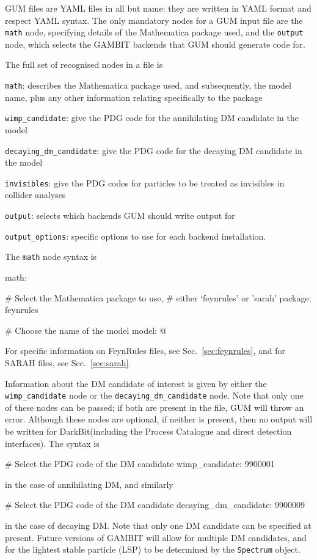 \documentclass[pdftex,twocolumn,epjc3_preprint,runningheads]{svjour3}
\renewcommand{\_}{\discretionary{\underscore}{}{\underscore}}
\newcommand\cpp[1]{{\lstinline!#1!}}  %
\newcommand\term[1]{{\lstset{style=terminal}\lstinline!#1!\lstset{style=cpp}}}
\newcommand\guminline[1]{{{\lstset{style=gum}\lstinline!#1!}}}
\newcommand{\gambit}{\textsf{GAMBIT}\xspace}
\newcommand{\darkbit}{\textsf{DarkBit}\xspace}
\newcommand{\GB}{\gambit}
\newcommand\Mathematica{\textsf{Mathematica}\xspace}
\newcommand{\gum}{\textsf{GUM}\xspace}
\newcommand{\dgum}{\!\!\term{.gum}\!\xspace}
\newcommand{\fr}{\textsf{FeynRules}\xspace}
\newcommand{\sarah}{\textsf{SARAH}\xspace}
\newcommand\YAML{\textsf{YAML}\xspace}
\begin{document}
\gum files are \YAML files in all but name: they are written in \YAML format and respect \YAML syntax.  The only mandatory nodes for a \gum input file are the \guminline{math} node, specifying details of the \Mathematica package used, and the \guminline{output} node, which selects the \GB backends that \gum should generate code for.

The full set of recognised nodes in a \dgum file is
%
\begin{description}
  \item \guminline{math}: describes the \Mathematica package used, and subsequently, the model name, plus any other information relating specifically to the package
  \item \guminline{wimp_candidate}: give the PDG code for the annihilating DM candidate in the model
  \item \guminline{decaying_dm_candidate}: give the PDG code for the decaying DM candidate in the model
  \item \guminline{invisibles}: give the PDG codes for particles to be treated as invisibles in collider analyses
  \item \guminline{output}: selects which backends \gum should write output for
  \item \guminline{output_options}: specific options to use for each backend installation.
\end{description}

The \guminline{math} node syntax is
%
\begin{lstgum}
math:

  # Select the Mathematica package to use,
  # either `feynrules' or 'sarah'
  package: feynrules

  # Choose the name of the model
  model: @\nm@
\end{lstgum}

For specific information on \fr files, see Sec.~\ref{sec:feynrules}, and for \sarah files, see Sec.~\ref{sec:sarah}.

Information about the DM candidate of interest is given by either the \guminline{wimp_candidate} node or the \guminline{decaying_dm_candidate} node.  Note that only one of these nodes can be passed; if both are present in the \dgum file, \gum will throw an error.  Although these nodes are optional, if neither is present, then no output will be written for \darkbit (including the Process Catalogue and direct detection interfaces). The syntax is
%
\begin{lstgum}
# Select the PDG code of the DM candidate
wimp_candidate: 9900001
\end{lstgum}
%
in the case of annihilating DM, and similarly
%
\begin{lstgum}
# Select the PDG code of the DM candidate
decaying_dm_candidate: 9900009
\end{lstgum}
%
in the case of decaying DM.  Note that only one DM candidate can be specified at present. Future versions of \GB will allow for multiple DM candidates, and for the lightest stable particle (LSP) to be determined by the \cpp{Spectrum} object.
\end{document}
